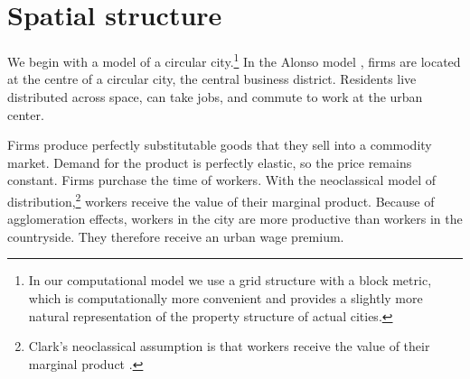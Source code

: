 
\section{Spatial structure}

%  

We begin with a model of a circular city.\footnote{In our computational model we use a grid structure with  a block metric, which is computationally more convenient and provides a slightly more natural representation of the property structure of actual cities.} %
In the \gls{Alonso model} \cite{alonsoTheoryUrbanLand1960, alonsoLocationLandUse1964}, firms are located at the centre of a circular city, the central business district. Residents live distributed across space, can take jobs, and commute to work at the urban center. 



Firms produce perfectly \gls{substitutable} %
goods that they sell into a commodity market. Demand for the \gls{product} is \gls{perfectly elastic}, so the price remains constant. 
Firms purchase the time of workers. %
With the neoclassical model of distribution,\footnote{Clark's neoclassical assumption is that workers receive the value of their marginal product \cite{clarkDistributionWealthTheory1899}.} 
workers receive the value of their marginal product. 
Because of agglomeration effects, workers in the city are more productive than workers in the countryside. They therefore receive an \gls{urban wage premium}.


